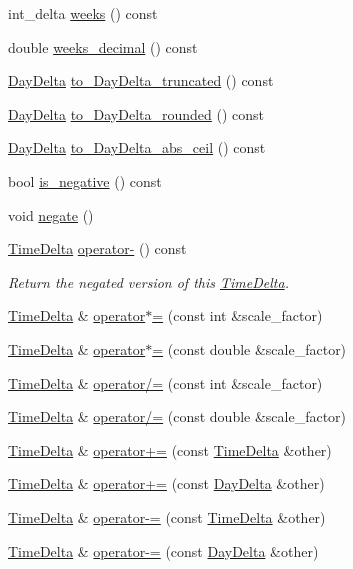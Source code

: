 \begin{DoxyCompactItemize}
\item 
int\-\_\-delta \hyperlink{structTimeDelta_a4e583a79abea664691df4680f4fd467d}{weeks} () const 
\item 
double \hyperlink{structTimeDelta_a11ca76e0cb990c9011a0ed91cda9ff8e}{weeks\-\_\-decimal} () const 
\item 
\hyperlink{structDayDelta}{\-Day\-Delta} \hyperlink{structTimeDelta_a9ec83cf81fc5e809bfdad62b084c9456}{to\-\_\-\-Day\-Delta\-\_\-truncated} () const 
\item 
\hyperlink{structDayDelta}{\-Day\-Delta} \hyperlink{structTimeDelta_ad4f0f7a7eb10b5c59e54faff404453e4}{to\-\_\-\-Day\-Delta\-\_\-rounded} () const 
\item 
\hyperlink{structDayDelta}{\-Day\-Delta} \hyperlink{structTimeDelta_a7febe32ac5264cc90c672bd65e316187}{to\-\_\-\-Day\-Delta\-\_\-abs\-\_\-ceil} () const 
\item 
bool \hyperlink{structTimeDelta_acc2faf0e9a1563c84fb68cad42521c54}{is\-\_\-negative} () const 
\item 
void \hyperlink{structTimeDelta_a858c8d0eae6070a24ba7fd3e18a3cf3f}{negate} ()
\item 
\hyperlink{structTimeDelta}{\-Time\-Delta} \hyperlink{structTimeDelta_a660df6f5ba7291bef24d5a05639563b6}{operator-\/} () const 
\begin{DoxyCompactList}\small\item\em \-Return the negated version of this \hyperlink{structTimeDelta}{\-Time\-Delta}. \end{DoxyCompactList}\item 
\hyperlink{structTimeDelta}{\-Time\-Delta} \& \hyperlink{structTimeDelta_aa1417029a51a1e2e7cf20445ad6cfa01}{operator$\ast$=} (const int \&scale\-\_\-factor)
\item 
\hyperlink{structTimeDelta}{\-Time\-Delta} \& \hyperlink{structTimeDelta_a8301b98264ca9539a160a756e4014559}{operator$\ast$=} (const double \&scale\-\_\-factor)
\item 
\hyperlink{structTimeDelta}{\-Time\-Delta} \& \hyperlink{structTimeDelta_ac3180211824572ea2f198ca1ad6887c9}{operator/=} (const int \&scale\-\_\-factor)
\item 
\hyperlink{structTimeDelta}{\-Time\-Delta} \& \hyperlink{structTimeDelta_ae514c2f5fa4266b53bb0220b89e50e54}{operator/=} (const double \&scale\-\_\-factor)
\item 
\hyperlink{structTimeDelta}{\-Time\-Delta} \& \hyperlink{structTimeDelta_ae8d415b1d359e1f6c6a68ee3c44ea21e}{operator+=} (const \hyperlink{structTimeDelta}{\-Time\-Delta} \&other)
\item 
\hyperlink{structTimeDelta}{\-Time\-Delta} \& \hyperlink{structTimeDelta_acf4db7ce2e954d9a706f3e85cd805e42}{operator+=} (const \hyperlink{structDayDelta}{\-Day\-Delta} \&other)
\item 
\hyperlink{structTimeDelta}{\-Time\-Delta} \& \hyperlink{structTimeDelta_adcacf2fa162c98c9a8c7278f0e32ce56}{operator-\/=} (const \hyperlink{structTimeDelta}{\-Time\-Delta} \&other)
\item 
\hyperlink{structTimeDelta}{\-Time\-Delta} \& \hyperlink{structTimeDelta_a8a8d2796e13a24266d46c54873d57eb2}{operator-\/=} (const \hyperlink{structDayDelta}{\-Day\-Delta} \&other)
\end{DoxyCompactItemize}
